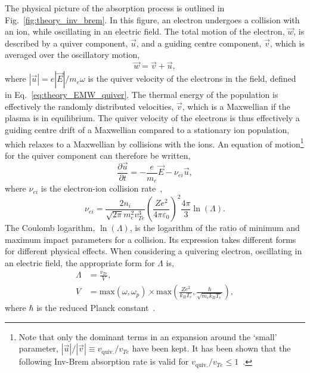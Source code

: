 The physical picture of the absorption process is outlined in Fig.~\ref{fig:theory_inv_brem}.
In this figure, an electron undergoes a collision with an ion, while oscillating in an electric field.
The total motion of the electron, $\vec{w}$, is described by a quiver component, $\vec{u}$, and a guiding centre component, $\vec{v}$, which is averaged over the oscillatory motion,
\begin{equation}
    \vec{w} = \vec{v} + \vec{u},
\end{equation}
where $|\vec{u}| = e|\vec{E}|/m_e \omega$ is the quiver velocity of the electrons in the field, defined in Eq.~\ref{eq:theory_EMW_quiver}.
The thermal energy of the population is effectively the randomly distributed velocities, $\vec{v}$, which is a Maxwellian if the plasma is in equilibrium.
The quiver velocity of the electrons is thus effectively a guiding centre drift of a Maxwellian compared to a stationary ion population, which relaxes to a Maxwellian by collisions with the ions.
An equation of motion\footnote{Note that only the dominant terms in an expansion around the `small' parameter, $|\vec{u}|/|\vec{v}|\equiv v_\text{quiv.}/v_{Te}$ have been kept. It has been shown that the following \ac{Inv-Brem} absorption rate is valid for $v_\text{quiv.}/v_{Te}\leq 1$~\cite{bunkin_interaction_1973}.} for the quiver component can therefore be written,
\begin{equation}
    \label{eq:theory_electron_quiver_partial}
    \frac{\partial\vec{u}}{\partial t} = - \frac{e}{m_e}\vec{E} - \nu_{ei} \vec{u},
\end{equation}
where $\nu_{ei}$ is the electron-ion collision rate~\cite{michel_introduction_2023},
\begin{equation}
    \nu_{ei} = \frac{2 n_i}{\sqrt{2\pi} m_e^2 v_{Te}^3} \left( \frac{Z e^2}{4 \pi \varepsilon_0} \right)^2 \frac{4\pi}{3} \ln{\left(\Lambda\right)}.
\end{equation}
The Coulomb logarithm, $\ln(\Lambda)$, is the logarithm of the ratio of minimum and maximum impact parameters for a collision.
Its expression takes different forms for different physical effects.
When considering a quivering electron, oscillating in an electric field, the appropriate form for $\Lambda$ is,
\begin{align}
    \Lambda &= \frac{v_{Te}}{V},\\
    V &= \text{max}\left( \omega, \omega_p \right) \times \text{max}\left( \frac{Z e^2}{k_B T_e}, \frac{\hbar}{\sqrt{m_e k_B T_e}} \right),
\end{align}
where $\hbar$ is the reduced Planck constant~\cite{huba_nrl_2013}.

